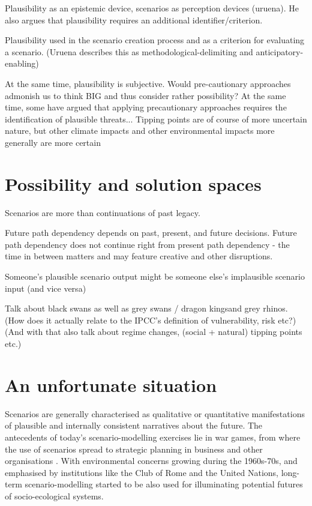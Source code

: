 \documentclass{article}
\begin{document}
\begin{refsection}
Plausibility as an epistemic device, scenarios as perception devices (uruena). He also argues that plausibility requires an additional identifier/criterion.

Plausibility used in the scenario creation process and as a criterion for evaluating a scenario. (Uruena describes this as methodological-delimiting and anticipatory-enabling)

At the same time, plausibility is subjective. Would pre-cautionary approaches admonish us to think BIG and thus consider rather possibility?
At the same time, some have argued that applying precautionary approaches requires the identification of plausible threats...
Tipping points are of course of more uncertain nature, but other climate impacts and other environmental impacts more generally are more certain

\section{Possibility and solution spaces}

Scenarios are more than continuations of past legacy.

Future path dependency depends on past, present, and future decisions. Future path dependency does not continue right from present path dependency - the time in between matters and may feature creative and other disruptions.

Someone's plausible scenario output might be someone else's implausible scenario input (and vice versa)

Talk about black swans as well as grey swans / dragon kingsand grey rhinos. (How does it actually relate to the IPCC's definition of vulnerability, risk etc?)
(And with that also talk about regime changes, (social + natural) tipping points etc.)

\label{main_part}
\section{An unfortunate situation}

Scenarios are generally characterised as qualitative or quantitative manifestations of plausible and internally consistent narratives about the future. The antecedents of today's scenario-modelling exercises lie in war games, from where the use of scenarios spread to strategic planning in business and other organisations \parencite{bradfield_2005,schoemaker_1993}.\footnotemark{} With environmental concerns growing during the 1960s-70s, and emphasised by institutions like the Club of Rome and the United Nations, long-term scenario-modelling started to be also used for illuminating potential futures of socio-ecological systems.


\end{refsection}
\end{document}
